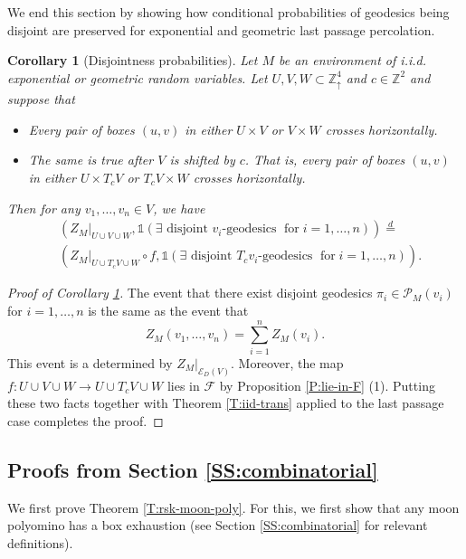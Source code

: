 \documentclass[aop, preprint]{imsart}
\theoremstyle{plain}
\newtheorem{corollary}[theorem]{Corollary}
\theoremstyle{definition}
\theoremstyle{plain}
\newcommand{\sset}{\subset}
\newcommand{\mathfor}{\;\text{for}\;}
\newcommand{\scrE}{\mathcal{E}}
\newcommand{\Zd}{\mathds{Z}^4_\uparrow}
\newcommand{\scrP}{\mathcal{P}}
\newcommand{\scrF}{\mathcal{F}}
\newcommand{\Z}{\mathds{Z}}
\newcommand{\eqd}{\stackrel{d}{=}}
\newcommand{\X}{\times}
\begin{document}
We end this section by showing how conditional probabilities of geodesics being disjoint are preserved for exponential and geometric last passage percolation.

\begin{corollary} [Disjointness probabilities]
	\label{C:disjointness}
	Let $M$ be an environment of i.i.d. exponential or geometric random variables. Let $U, V, W \sset \Zd$ and $c \in \Z^2$ and suppose that 
	\begin{itemize}
		\item Every pair of boxes $(u, v)$ in either $U \X V$ or $V \X W$ crosses horizontally.
		\item The same is true after $V$ is shifted by $c$. That is, every pair of boxes $(u, v)$ in either $U \X T_cV$ or $T_cV \X W$ crosses horizontally.
	\end{itemize}
	Then for any $v_1, \dots, v_n \in V$, we have
	\begin{align*}
	&(Z_M|_{U \cup V \cup W}, \mathds{1}(\exists \text{ disjoint $v_i$-geodesics } \mathfor i = 1, \dots, n)) \eqd \\
	&(Z_M|_{U \cup T_c V \cup W} \circ f, \mathds{1}(\exists \text{ disjoint $T_c v_i$-geodesics } \mathfor i = 1, \dots, n)).
	\end{align*}
	
\end{corollary}





\begin{proof}[Proof of Corollary \ref{C:disjointness}]
	The event that there exist disjoint geodesics $\pi_i \in \scrP_M(v_i)$ for $i = 1, \dots, n$ is the same as the event that
	$$
	Z_M(v_1, \dots, v_n) = \sum_{i=1}^n Z_M(v_i).
	$$
	This event is a determined by $Z_M|_{\scrE_D(V)}$. Moreover, the  map $f:U \cup V \cup W \to U \cup T_c V \cup W$ lies in $\scrF$ by Proposition \ref{P:lie-in-F} (1). Putting these two facts together with Theorem \ref{T:iid-trans} applied to the last passage case completes the proof.
\end{proof}

\subsection{Proofs from Section \ref{SS:combinatorial}}
\label{SS:comb-proof}

We first prove Theorem \ref{T:rsk-moon-poly}. For this, we first show that any moon polyomino has a box exhaustion (see Section \ref{SS:combinatorial} for relevant definitions).
\end{document}
